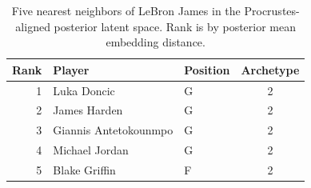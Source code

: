 \begin{table}[htbp]
  \centering\small
  \begin{tabular}{rllc}
    \toprule
    Rank & Player & Position & Archetype \\
    \midrule
    1 & Luka Doncic & G & 2 \\
    2 & James Harden & G & 2 \\
    3 & Giannis Antetokounmpo & G & 2 \\
    4 & Michael Jordan & G & 2 \\
    5 & Blake Griffin & F & 2 \\
    \bottomrule
  \end{tabular}
  \caption{Five nearest neighbors of LeBron James in the Procrustes-aligned posterior latent space. Rank is by posterior mean embedding distance.}
  \label{tab:LeBron_James_neighbors}
\end{table}

